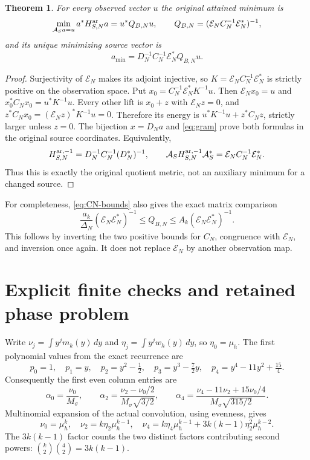 \documentclass[11pt]{article}
\newtheorem{theorem}{Theorem}
\begin{document}
\begin{theorem}\label{thm:quotient}
For every observed vector $u$ the original attained minimum is
\begin{equation}\label{eq:quotient}
 \min_{\mathcal A_Sa=u}a^*H_{S,N}^{\rm ar}a
  =u^*Q_{B,N}u,\qquad
 Q_{B,N}=(\mathcal E_NC_N^{-1}\mathcal E_N^*)^{-1},
\end{equation}
and its unique minimizing source vector is
\begin{equation}\label{eq:lift}
 a_{\min}=D_N^{-1}C_N^{-1}\mathcal E_N^*Q_{B,N}u.
\end{equation}
\end{theorem}
\begin{proof}
Surjectivity of $\mathcal E_N$ makes its adjoint injective, so
$K=\mathcal E_NC_N^{-1}\mathcal E_N^*$ is strictly positive on the
observation space. Put $x_0=C_N^{-1}\mathcal E_N^*K^{-1}u$.
Then $\mathcal E_Nx_0=u$ and
$x_0^*C_Nx_0=u^*K^{-1}u$. Every other lift is $x_0+z$ with
$\mathcal E_Nz=0$, and
$z^*C_Nx_0=(\mathcal E_Nz)^*K^{-1}u=0$. Therefore its energy is
$u^*K^{-1}u+z^*C_Nz$, strictly larger unless $z=0$.
The bijection $x=D_Na$ and \eqref{eq:gram} prove both formulas in
the original source coordinates. Equivalently,
\[
 H_{S,N}^{{\rm ar},-1}=D_N^{-1}C_N^{-1}(D_N^*)^{-1},\qquad
 \mathcal A_SH_{S,N}^{{\rm ar},-1}\mathcal A_S^*
                   =\mathcal E_NC_N^{-1}\mathcal E_N^*.
\]
Thus this is exactly the original quotient metric, not an auxiliary
minimum for a changed source.
\end{proof}

For completeness, \eqref{eq:CN-bounds} also gives the exact matrix
comparison
\[
 \frac{a_k}{\Delta_N}(\mathcal E_N\mathcal E_N^*)^{-1}
       \leq Q_{B,N}\leq
 A_k(\mathcal E_N\mathcal E_N^*)^{-1}.
\]
This follows by inverting the two positive bounds for $C_N$,
congruence with $\mathcal E_N$, and inversion once again. It does
not replace $\mathcal E_N$ by another observation map.

\section{Explicit finite checks and retained phase problem}

Write $\nu_j=\int y^jm_k(y)\,dy$ and
$\eta_j=\int y^jw_h(y)\,dy$, so $\eta_0=\mu_h$.
The first polynomial values from the exact recurrence are
\[
 p_0=1,\quad p_1=y,\quad p_2=y^2-\tfrac12,\quad
 p_3=y^3-\tfrac72y,\quad p_4=y^4-11y^2+\tfrac{15}4.
\]
Consequently the first even column entries are
\[
 \alpha_0=\frac{\nu_0}{M_\sigma},\qquad
 \alpha_2=\frac{\nu_2-\nu_0/2}{M_\sigma\sqrt{3/2}},\qquad
 \alpha_4=\frac{\nu_4-11\nu_2+15\nu_0/4}
                   {M_\sigma\sqrt{315/2}}.
\]
Multinomial expansion of the actual convolution, using evenness,
gives
\[
 \nu_0=\mu_h^k,\quad \nu_2=k\eta_2\mu_h^{k-1},\quad
 \nu_4=k\eta_4\mu_h^{k-1}
              +3k(k-1)\eta_2^2\mu_h^{k-2}.
\]
The $3k(k-1)$ factor counts the two distinct factors contributing
second powers: $\binom{k}{2}\binom42=3k(k-1)$.
\end{document}
